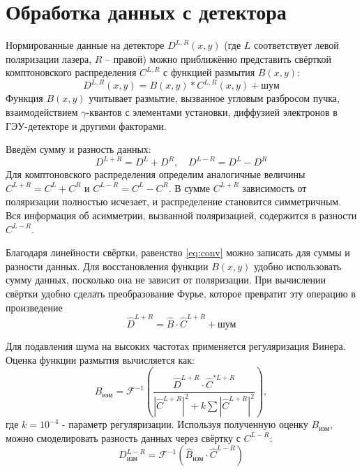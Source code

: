 \documentclass[14pt, a4paper]{extreport}
\begin{document}
\section{Обработка данных с детектора}
Нормированные данные на детекторе $D^{L,R}(x,y)$ (где $L$ соответствует левой поляризации лазера, $R$ -- правой) можно приближённо представить свёрткой комптоновского распределения $C^{L,R}$ с функцией размытия $B(x,y)$:
\begin{equation}
\label{eq:conv}
    D^{L,R}(x,y) = B(x,y) * C^{L,R}(x,y) + \text{шум}
\end{equation}
Функция $B(x,y)$ учитывает размытие, вызванное угловым разбросом пучка, взаимодействием 
$\gamma$-квантов с элементами установки, диффузией электронов в ГЭУ-детекторе и другими факторами.

Введём сумму и разность данных:
\begin{equation}
    D^{L+R} = D^L+D^R, \quad D^{L-R} = D^L-D^R
\end{equation}
Для комптоновского распределения определим аналогичные величины $C^{L+R} = C^L+C^R$ и 
$C^{L-R} = C^L - C^R$. В сумме $C^{L+R}$ зависимость от поляризации полностью исчезает, и распределение становится симметричным. Вся информация об асимметрии, вызванной поляризацией, содержится в разности $C^{L-R}$.

Благодаря линейности свёртки, равенство \eqref{eq:conv} можно записать для суммы и разности данных. Для восстановления функции $B(x,y)$ удобно использовать сумму данных, посколько она не зависит от поляризации. При вычислении свёртки удобно сделать преобразование Фурье, которое превратит эту операцию в произведение
\begin{equation}
    \widehat{D}^{L+R} = \widehat{B} \cdot \widehat{C}^{L+R} + \text{шум}
\end{equation}

Для подавления шума на высоких частотах применяется регуляризация Винера. Оценка функции размытия вычисляется как:
\begin{equation}
    B_{\text{изм}} = \mathcal{F}^{-1}\left(\dfrac{\widehat{D}^{L+R}\cdot \widehat{C}^{*L+R}}{|\widehat{C}^{L+R}|^2 + k\sum |\widehat{C}^{L+R}|^2}\right),
\end{equation}
где $k = 10^{-4}$ - параметр регуляризации.
Используя полученную оценку $B_{\text{изм}}$, можно смоделировать разность данных через свёртку с $C^{L-R}$:
\begin{equation}
    D_{\text{изм}}^{L-R} = \mathcal{F}^{-1}\left(\widehat{B}_{\text{изм}} \cdot \widehat{C}^{L-R} \right)
\end{equation}
\end{document}
